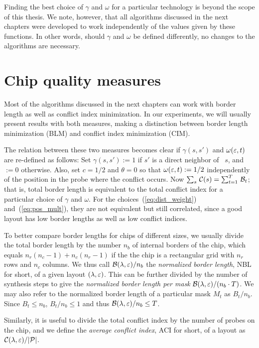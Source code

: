 Finding the best choice of $\gamma$ and $\omega$ for a particular technology is
beyond the scope of this thesis. We note, however, that all algorithms discussed
in the next chapters were developed to work independently of the values given by
these functions. In other words, should $\gamma$ and $\omega$ be defined
differently, no changes to the algorithms are necessary.

\section{Chip quality measures}
\label{sec:mlp_bl_vs_ci}

Most of the algorithms discussed in the next chapters can work with border
length as well as conflict index minimization. In our experiments, we will
usually present results with both measures, making a distinction between border
length minimization (BLM) and conflict index minimization (CIM).

The relation between these two
measures becomes clear if $\gamma(s,s')$ and $\omega(\varepsilon,t)$ are re-defined as
follows: Set $\gamma(s,s') := 1$ if $s'$ is a direct neighbor of~ $s$, and $:=0$
otherwise. Also, set $c=1/2$ and $\theta=0$ so that $\omega(\varepsilon,t) := 1/2$
independently of the position in the probe where the conflict occurs. Now
$\sum_s\, {\mathcal{C}}(s) = \sum_{t=1}^T\, {\mathcal{B}}_t$; that is, total border length is
equivalent to the total conflict index for a particular choice of $\gamma$ and
$\omega$. For the choices~(\ref{eq:dist_weight}) and~(\ref{eq:pos_mult}), they
are not equivalent but still correlated, since a good layout has low border
lengths as well as low conflict indices.

To better compare border lengths for chips of different sizes, we usually divide
the total border length by the number $n_b$ of internal borders of the chip,
which equals $n_r(n_c - 1) + n_c(n_r - 1)$ if the the chip is a rectangular grid
with $n_r$ rows and $n_c$ columns. We thus call ${\mathcal{B}}(\lambda,\varepsilon)/n_b$ the
\emph{normalized border length}, NBL for short, of a given layout
$(\lambda,\varepsilon)$. This can be further divided by the number of synthesis steps
to give the \emph{normalized border length per mask}
${\mathcal{B}}(\lambda,\varepsilon)/(n_b \cdot T)$. We may also refer to the normalized border
length of a particular mask $M_t$ as $B_t/n_b$. Since $B_t \leq n_b$,
$B_t/n_b \leq 1$ and thus ${\mathcal{B}}(\lambda,\varepsilon)/n_b \leq T$.

Similarly, it is useful to divide the total conflict index by the number of
probes on the chip, and we define the \emph{average conflict index}, ACI for
short, of a layout as ${\mathcal{C}}(\lambda,\varepsilon)/|{\mathcal{P}}|$.


